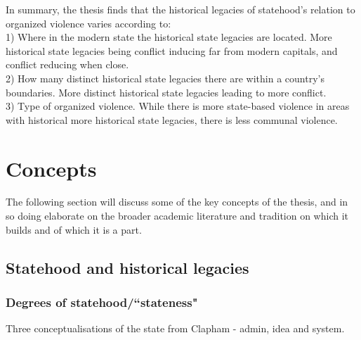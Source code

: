 \documentclass[12pt]{article}
\begin{document}
In summary, the thesis finds that the historical legacies of statehood's
relation to organized violence varies according to:\\

1) Where in the modern state the historical state legacies are located. More
historical state legacies being conflict inducing far from modern capitals, and
conflict reducing when close.\\

2) How many distinct historical state legacies there are within a country's 
boundaries. More distinct historical state legacies leading to more conflict.\\

3) Type of organized violence. While there is more state-based violence in areas
with historical more historical state legacies, there is less communal
violence.\\

\section{Concepts} \label{Concepts}

The following section will discuss some of the key concepts of the thesis, and in
so doing elaborate on the broader academic literature and tradition on which it
builds and of which it is a part.

\subsection{Statehood and historical legacies} \label{Statehood and historical legacies}

\subsubsection{Degrees of statehood/``stateness"} \label{Degrees of statehood} %

Three conceptualisations of the state from Clapham - admin, idea and system.
\end{document}

